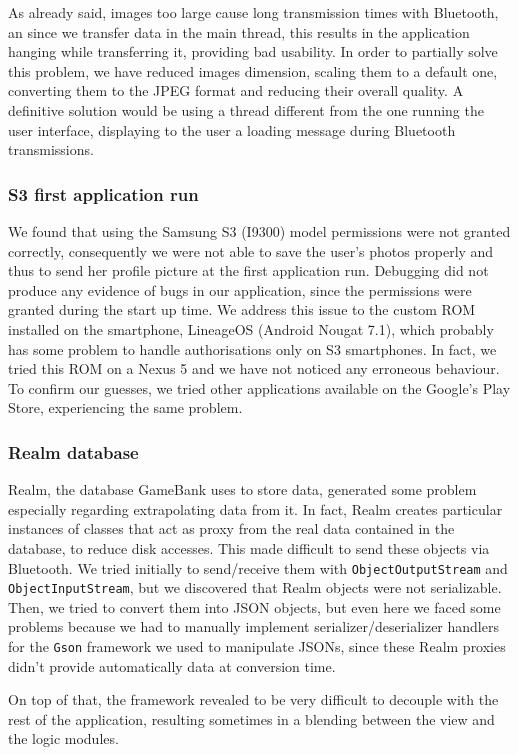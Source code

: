 As already said, images too large cause long transmission times with Bluetooth, 
an since we transfer data  in the main thread, this results in the application 
hanging while transferring it, providing bad usability. In order to partially 
solve this problem, we have reduced images dimension, scaling them to a default 
one, converting them to the JPEG format and reducing their overall quality. A 
definitive solution would be using a thread different from the one running the 
user interface, displaying to the user a loading message during Bluetooth 
transmissions.

\subsubsection{S3 first application run}

We found that using the Samsung S3 (I9300) model permissions were not granted 
correctly, consequently we were not able to save the user's photos properly and 
thus to send her profile picture at the first application run. Debugging did 
not produce any evidence of bugs in our application, since the permissions 
were granted during the start up time.
We address this issue to the custom ROM installed on the smartphone, LineageOS 
(Android Nougat 7.1), which probably has some problem to handle authorisations 
only on S3 smartphones. In fact, we tried this ROM on a Nexus 5 and we have not 
noticed any erroneous behaviour. To confirm our guesses, we tried other 
applications available on the Google's Play Store, experiencing the same 
problem.

\subsubsection{Realm database}

Realm, the database GameBank uses to store data, generated some problem 
especially regarding extrapolating data from it. In fact, Realm creates 
particular instances of classes that act as proxy from the real data contained 
in the database, to reduce disk accesses. This made difficult to send these  
objects via Bluetooth. We tried initially to send/receive them with 
\texttt{ObjectOutputStream} and \texttt{ObjectInputStream}, but we discovered 
that Realm objects were not serializable. Then, we tried to convert them into 
JSON objects, but even here we faced some problems because we had to manually 
implement serializer/deserializer handlers for the \texttt{Gson} framework we 
used to manipulate JSONs, since these Realm proxies didn't provide 
automatically data at conversion time.

On top of that, the framework revealed to be very difficult to decouple with the 
rest of the application, resulting sometimes in a blending between the view and 
the logic modules.
